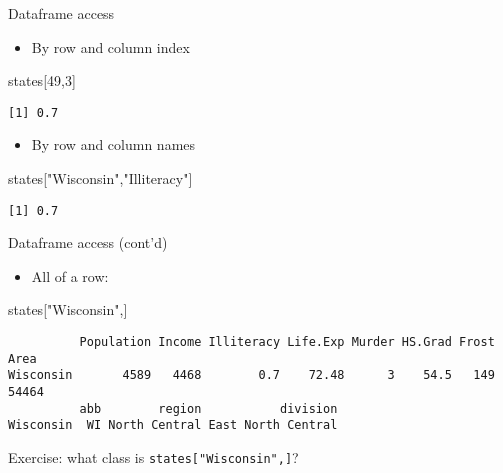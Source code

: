 \documentclass[8pt,ignorenonframetext,]{beamer}
\newenvironment{Shaded}{\begin{snugshade}}{\end{snugshade}}
\newcommand{\DecValTok}[1]{\textcolor[rgb]{0.00,0.00,0.81}{#1}}
\newcommand{\StringTok}[1]{\textcolor[rgb]{0.31,0.60,0.02}{#1}}
\newcommand{\NormalTok}[1]{#1}
\providecommand{\tightlist}{%
  \setlength{\itemsep}{0pt}\setlength{\parskip}{0pt}}
\begin{document}
\begin{frame}[fragile]{Dataframe access}

\begin{itemize}
\tightlist
\item
  By row and column index
\end{itemize}

\begin{Shaded}
\begin{Highlighting}[]
\NormalTok{states[}\DecValTok{49}\NormalTok{,}\DecValTok{3}\NormalTok{]}
\end{Highlighting}
\end{Shaded}

\begin{verbatim}
[1] 0.7
\end{verbatim}

\begin{itemize}
\tightlist
\item
  By row and column names
\end{itemize}

\begin{Shaded}
\begin{Highlighting}[]
\NormalTok{states[}\StringTok{"Wisconsin"}\NormalTok{,}\StringTok{"Illiteracy"}\NormalTok{]}
\end{Highlighting}
\end{Shaded}

\begin{verbatim}
[1] 0.7
\end{verbatim}

\end{frame}

\begin{frame}[fragile]{Dataframe access (cont'd)}

\begin{itemize}
\tightlist
\item
  All of a row:
\end{itemize}

\begin{Shaded}
\begin{Highlighting}[]
\NormalTok{states[}\StringTok{"Wisconsin"}\NormalTok{,]}
\end{Highlighting}
\end{Shaded}

\begin{verbatim}
          Population Income Illiteracy Life.Exp Murder HS.Grad Frost  Area
Wisconsin       4589   4468        0.7    72.48      3    54.5   149 54464
          abb        region           division
Wisconsin  WI North Central East North Central
\end{verbatim}

Exercise: what class is \texttt{states{[}"Wisconsin",{]}}?

\end{frame}
\end{document}
